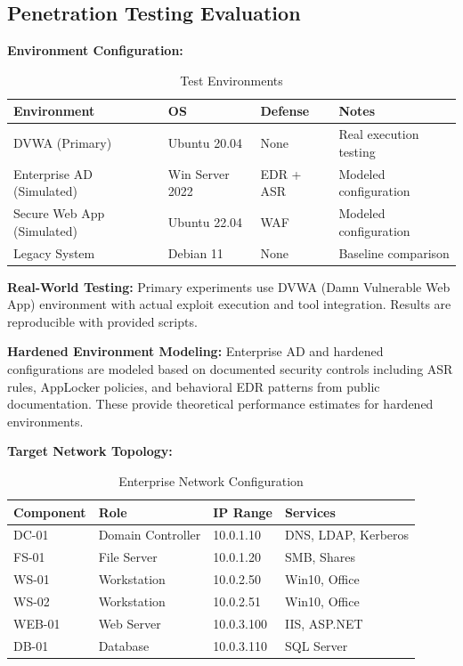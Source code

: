 \documentclass[preprint,12pt]{elsarticle}
\begin{document}
\subsection{Penetration Testing Evaluation}

\textbf{Environment Configuration:}

\begin{table}[htbp]
\centering
\caption{Test Environments}
\label{tab:environments}
\begin{tabular}{llll}
\toprule
\textbf{Environment} & \textbf{OS} & \textbf{Defense} & \textbf{Notes} \\
\midrule
DVWA (Primary) & Ubuntu 20.04 & None & Real execution testing \\
Enterprise AD (Simulated) & Win Server 2022 & EDR + ASR & Modeled configuration \\
Secure Web App (Simulated) & Ubuntu 22.04 & WAF & Modeled configuration \\
Legacy System & Debian 11 & None & Baseline comparison \\
\bottomrule
\end{tabular}
\end{table}

\textbf{Real-World Testing:} Primary experiments use DVWA (Damn Vulnerable Web App) environment with actual exploit execution and tool integration. Results are reproducible with provided scripts.

\textbf{Hardened Environment Modeling:} Enterprise AD and hardened configurations are modeled based on documented security controls including ASR rules, AppLocker policies, and behavioral EDR patterns from public documentation. These provide theoretical performance estimates for hardened environments.

\textbf{Target Network Topology:}

\begin{table}[htbp]
\centering
\caption{Enterprise Network Configuration}
\label{tab:network}
\begin{tabular}{llll}
\toprule
\textbf{Component} & \textbf{Role} & \textbf{IP Range} & \textbf{Services} \\
\midrule
DC-01 & Domain Controller & 10.0.1.10 & DNS, LDAP, Kerberos \\
FS-01 & File Server & 10.0.1.20 & SMB, Shares \\
WS-01 & Workstation & 10.0.2.50 & Win10, Office \\
WS-02 & Workstation & 10.0.2.51 & Win10, Office \\
WEB-01 & Web Server & 10.0.3.100 & IIS, ASP.NET \\
DB-01 & Database & 10.0.3.110 & SQL Server \\
\bottomrule
\end{tabular}
\end{table}
\end{document}
